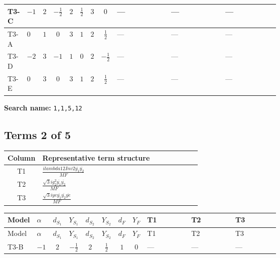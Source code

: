 \documentclass[8pt]{article}
\begin{document}
\begin{landscape}
\begin{longtable}{@{}llcccccc >{\raggedright\arraybackslash}p{0.21\linewidth} >{\raggedright\arraybackslash}p{0.21\linewidth} >{\raggedright\arraybackslash}p{0.21\linewidth}@{}}
\midrule
T3-C & $-1$ & $2$ & $-\frac{1}{2}$ & $2$ & $\frac{1}{2}$ & $3$ & $0$ & --- & --- & --- \\
\midrule
T3-A & $0$ & $1$ & $0$ & $3$ & $1$ & $2$ & $\frac{1}{2}$ & --- & --- & --- \\
\midrule
T3-D & $-2$ & $3$ & $-1$ & $1$ & $0$ & $2$ & $-\frac{1}{2}$ & --- & --- & --- \\
\midrule
T3-E & $0$ & $3$ & $0$ & $3$ & $1$ & $2$ & $\frac{1}{2}$ & --- & --- & --- \\
\midrule
\bottomrule
\end{longtable}
\clearpage
\noindent\textbf{Search name: }\texttt{1,1,5,12}\par\smallskip
\subsection*{Terms 2 of 5}
\begin{center}
\begin{tabular}{@{}c >{\raggedright\arraybackslash}p{0.82\linewidth}@{}}
\toprule
Column & Representative term structure \\
\midrule
T1 & \(\displaystyle \frac{i lambda12Inv2 \overline{y_{1}} \overline{y_{2}}}{MF}\) \\
\midrule
T2 & \(\displaystyle \frac{\sqrt{3} i g_{2}^{2} \overline{y_{1}} \overline{y_{2}}}{MF}\) \\
\midrule
T3 & \(\displaystyle \frac{\sqrt{3} i ye \overline{y_{1}} \overline{y_{2}} \overline{ye}}{MF}\) \\
\midrule
\bottomrule
\end{tabular}
\end{center}
\smallskip
\tiny
\begin{longtable}{@{}llcccccc >{\raggedright\arraybackslash}p{0.21\linewidth} >{\raggedright\arraybackslash}p{0.21\linewidth} >{\raggedright\arraybackslash}p{0.21\linewidth}@{}}
\toprule
Model & $\alpha$ & $d_{S_1}$ & $Y_{S_1}$ & $d_{S_2}$ & $Y_{S_2}$ & $d_F$ & $Y_F$ & T1 & T2 & T3 \\
\midrule
\endfirsthead
\toprule
Model & $\alpha$ & $d_{S_1}$ & $Y_{S_1}$ & $d_{S_2}$ & $Y_{S_2}$ & $d_F$ & $Y_F$ & T1 & T2 & T3 \\
\midrule
\endhead
T3-B & $-1$ & $2$ & $-\frac{1}{2}$ & $2$ & $\frac{1}{2}$ & $1$ & $0$ & --- & --- & --- \\
\midrule

\end{longtable}
\end{landscape}
\end{document}

